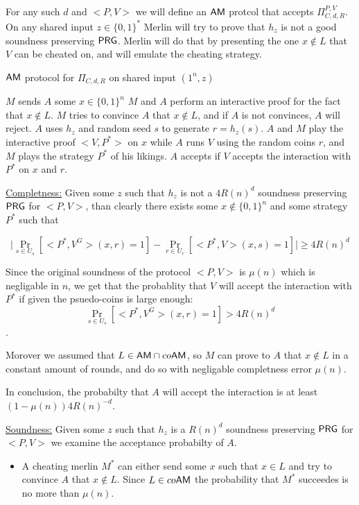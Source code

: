 \documentclass[11]{article}
\newenvironment{proof}[1][Proof]{\begin{trivlist}
\item[\hskip \labelsep {\bfseries #1}]}{\end{trivlist}}
\begin{document}
\begin{proof}

For any such $d$ and $<P,V>$ we will define an $\mathsf{AM}$ protcol that accepts $\Pi_{C,d,R}^{P,V}$. On any shared input $z \in \{0,1\}^*$ Merlin will try to prove that $h_z$ is not a good soundness preserving $\mathsf{PRG}$. Merlin will do that by presenting the one $x \notin L$ that $V$ can be cheated on, and will emulate the cheating strategy.


\begin{algorithm}
\caption{$\mathsf{AM}$ protocol for $\Pi_{C,d,R}$ on shared input $(1^n, z)$}
\begin{algorithmic}[1]

\State $M$ sends $A$ some $x \in \{0,1\}^n$
\State $M$ and $A$ perform an interactive proof for the fact that $x \notin L$. $M$ tries to convince $A$ that $x \notin L$, and if $A$ is not convinces, $A$ will reject.
\State $A$ uses $h_z$ and random seed $s$ to generate $r = h_z(s)$.
\State $A$ and $M$ play the interactive proof $<V, P^*>$ on $x$ while $A$ runs $V$ using the random coins $r$, and $M$ plays the strategy $P^*$ of his likings.
\State $A$ accepts if $V$ accepts the interaction with $P^*$ on $x$ and $r$.

\end{algorithmic}
\end{algorithm}

\underline{Completness:}
Given some $z$ such that $h_z$ is not a $4R(n)^d$ soundness preserving $\mathsf{PRG}$ for $<P,V>$, than clearly there exists some $x \notin \{0,1\}^n$ and some strategy $P^*$ such that  

$$\bigg|\Pr_{s \in U_s}[<P^*,V^G>(x, r) = 1] - \Pr_{r \in U_r}[<P^*, V>(x, s) = 1]\bigg| \geq 4R(n)^d$$

Since the original soundness of the protocol $<P,V>$ is $\mu(n)$ which is negligable in $n$, we get that the probablity that $V$ will accept the interaction with $P^*$ if given the psuedo-coins is large enough:$$\Pr_{s \in U_s}[<P^*,V^G>(x, r) = 1] > 4R(n)^d$$.

Morover we assumed that $L \in \mathsf{AM} \cap co\mathsf{AM}$, so $M$ can prove to $A$ that $x \notin L$ in a constant amount of rounds, and do so with negligable completness error $\mu(n)$.

In conclusion, the probabilty that $A$ will accept the interaction is at least $(1-\mu(n))4R(n)^{-d}$.

\underline{Soundness:}
Given some $z$ such that $h_z$ is a $R(n)^d$ soundness preserving $\mathsf{PRG}$ for $<P,V>$ we examine the acceptance probabilty of $A$. 
\begin{itemize}
	\item A cheating merlin $M^*$ can either send some $x$ such that $x \in L$ and try to convince $A$ that $x \notin L$. Since $L \in co\mathsf{AM}$ the probability that $M^*$ succeedes is no more than $\mu(n)$.
	

\end{itemize}
\end{proof}
\end{document}
